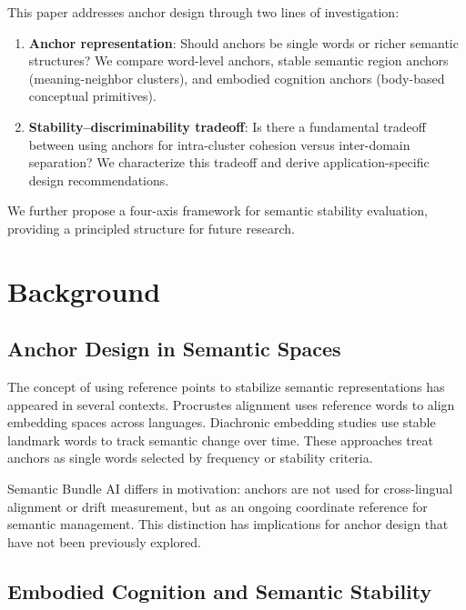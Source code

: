 \documentclass[11pt,a4paper]{article}
\begin{document}
This paper addresses anchor design through two lines of investigation:

\begin{enumerate}
\item \textbf{Anchor representation}: Should anchors be single words or
richer semantic structures? We compare word-level anchors, stable semantic
region anchors (meaning-neighbor clusters), and embodied cognition anchors
(body-based conceptual primitives).

\item \textbf{Stability--discriminability tradeoff}: Is there a fundamental
tradeoff between using anchors for intra-cluster cohesion versus
inter-domain separation? We characterize this tradeoff and derive
application-specific design recommendations.
\end{enumerate}

We further propose a four-axis framework for semantic stability evaluation,
providing a principled structure for future research.

\section{Background}
\label{sec:background}

\subsection{Anchor Design in Semantic Spaces}

The concept of using reference points to stabilize semantic representations
has appeared in several contexts. Procrustes alignment \cite{smith2017offline}
uses reference words to align embedding spaces across languages. Diachronic
embedding studies \cite{hamilton2016diachronic} use stable landmark words
to track semantic change over time. These approaches treat anchors as
single words selected by frequency or stability criteria.

Semantic Bundle AI differs in motivation: anchors are not used for
cross-lingual alignment or drift measurement, but as an ongoing coordinate
reference for semantic management. This distinction has implications for
anchor design that have not been previously explored.

\subsection{Embodied Cognition and Semantic Stability}
\end{document}
